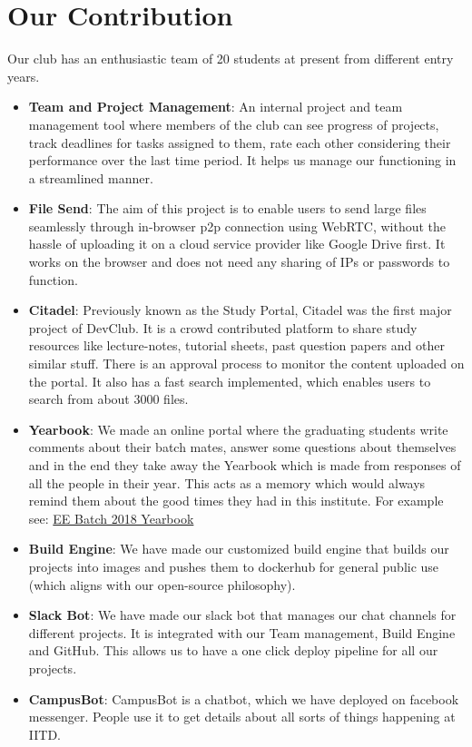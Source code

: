 \documentclass[10pt,a4paper]{article}
\begin{document}
\section{Our Contribution}
Our club has an enthusiastic team of 20 students at present from different entry years.
\begin{itemize}
    \item \textbf{Team and Project Management}: An internal project and team management tool where members of the club can see progress of projects, track deadlines for tasks assigned to them, rate each other considering their performance over the last time period. It helps us manage our functioning in a streamlined manner.
    \item \textbf{File Send}: The aim of this project is to enable users to send large files seamlessly through in-browser p2p connection using WebRTC, without the hassle of uploading it on a cloud service provider like Google Drive first. It works on the browser and does not need any sharing of IPs or passwords to function.
    \item \textbf{Citadel}: Previously known as the Study Portal, Citadel was the first major project of DevClub. It is a crowd contributed platform to share study resources like lecture-notes, tutorial sheets, past question papers and other similar stuff. There is an approval process to monitor the content uploaded on the portal. It also has a fast search implemented, which enables users to search from about 3000 files.
    \item \textbf{Yearbook}: We made an online portal where the graduating students write comments about their batch mates, answer some questions about themselves and in the end they take away the Yearbook which is made from responses of all the people in their year. This acts as a memory which would always remind them about the good times they had in this institute. For example see: \href{https://devclub.in/yearbooks/ee.pdf}{EE Batch 2018 Yearbook}
    \item \textbf{Build Engine}: We have made our customized build engine that builds our projects into images and pushes them to dockerhub for general public use (which aligns with our open-source philosophy).
    \item \textbf{Slack Bot}: We have made our slack bot that manages our chat channels for different projects. It is integrated with our Team management, Build Engine and GitHub. This allows us to have a one click deploy pipeline for all our projects.
    \item \textbf{CampusBot}: CampusBot is a chatbot, which we have deployed on facebook messenger. People use it to get details about all sorts of things happening at IITD.
\end{itemize}
\end{document}
